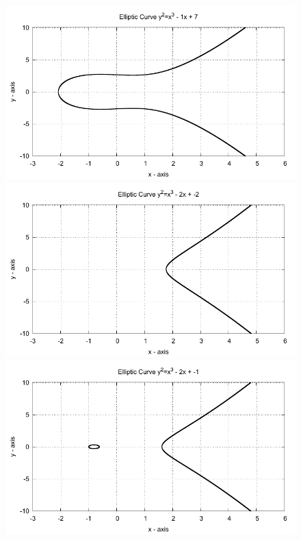 \begin{figure}[!htbp]

  \begin{minipage}{0.3\textwidth} \centering
    \includegraphics{../Images/ecc_plot/19}
  \end{minipage}
  \begin{minipage}{0.3\textwidth} \centering
    \includegraphics{../Images/ecc_plot/20}
  \end{minipage}
  \begin{minipage}{0.3\textwidth} \centering
    \includegraphics{../Images/ecc_plot/21}
  \end{minipage}
\end{figure}

